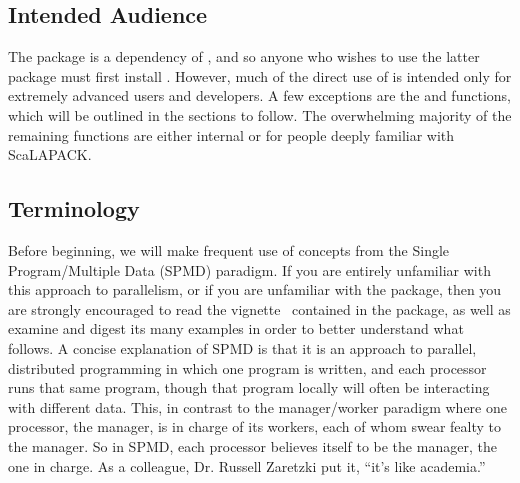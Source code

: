 \subsection{Intended Audience}
\label{sec:more_examples}

The  package is a dependency of , and so anyone who wishes to use the latter package must first install .  However, much of the direct use of  is intended only for extremely advanced users and developers.  A few exceptions are the  and  functions, which will be outlined in the sections to follow.  The overwhelming majority of the remaining functions are either internal or for people deeply familiar with ScaLAPACK.





\subsection{Terminology}
Before beginning, we will make frequent use of concepts from the Single Program/Multiple Data (SPMD) paradigm.  If you are entirely unfamiliar with this approach to parallelism, or if you are unfamiliar with the  package, then you are strongly encouraged to read the vignette~\citep{Chen2012pbdMPIvignette} contained in the  package, as well as examine and digest its many examples in order to better understand what follows.
\np
A concise explanation of SPMD is that it is an approach to parallel, distributed programming in which one program is written, and each processor runs that same program, though that program locally will often be interacting with different data.  This, in contrast to the manager/worker paradigm where one processor, the manager, is in charge of its workers, each of whom swear fealty to the manager.  So in SPMD, each processor believes itself to be the manager, the one in charge.  As a colleague, Dr. Russell Zaretzki put it, ``it's like academia.''
